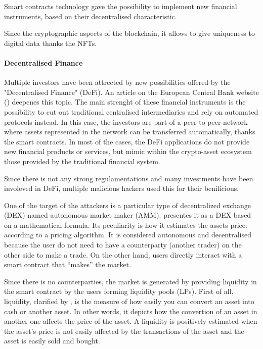 Smart contracts technology gave the possibility to implement new financial instruments, 
based on their decentralised characteristic. 

Since the cryptographic aspects of the blockchain, it allows to give uniqueness to digital data thanks the NFTs.

\paragraph{Decentralised Finance} Multiple investors have been attrected by new possibilities offered by the "Decentralised Finance" (DeFi).
An article on the European Central Bank website (\cite{DeFiDef}) deepenes this topic. The main strenght of these financial instruments is the possibility to cut out traditional centralised intermediaries and rely on automated protocols instead. 
In this case, the investors are part of a peer-to-peer network where assets represented in the network can be transferred automatically, thanks the smart contracts.
In most of the cases, the DeFi applications do not provide new financial products or services, but mimic within the crypto-asset ecosystem those provided by the traditional financial system.

Since there is not any strong regulamentations and many investments have been involeved in DeFi, multiple malicious hackers used this for their benificious.

One of the target of the attackers is a particular type of decentralized exchange (DEX) named autonomous market maker (AMM). 
\citet{AMMDef} presentes it as a DEX based on a mathematical formula. Its peculiarity is how it estimates the assets price: according to a pricing algorithm.
It is considered autonomous and decentralised because the user do not need to have a counterparty (another trader) on the other side to make a trade. 
On the other hand, users directly interact with a smart contract that “makes” the market.

Since there is no counterparties, the market is generated by providing liquidity in the smart contract by the users forming liquidity pools (LPs).
First of all, liquidity, clarified by \citet{LiquidityDef}, is the measure of how easily you can convert an asset into cash or another asset. 
In other words, it depicts how the convertion of an asset in another one affects the price of the asset.
A liquidity is positively estimated when the asset's price is not easily affected by the transactions of the asset and the asset is easily sold and bought. 

